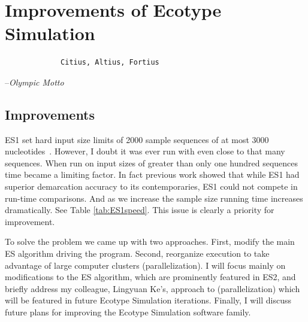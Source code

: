 \chapter{Improvements of Ecotype Simulation}


\begin{shadequote}
\begin{center}
    \Large\begin{verbatim} 
             Citius, Altius, Fortius
 \end{verbatim}  
\end{center}
\par--\emph{Olympic Motto}
\end{shadequote}


\section{Improvements}
ES1 set hard input size limits of 2000 sample sequences of at most 3000 nucleotides~\cite{koeppel2008identifying}.
However, I doubt it was ever run with even close to that many sequences.
When run on input sizes of greater than only one hundred sequences time became a limiting factor.
In fact previous work showed that while ES1 had superior demarcation accuracy to its contemporaries, ES1 could not compete in run-time comparisons.
And as we increase the sample size running time increases dramatically.
See Table \ref{tab:ES1speed}.
This issue is clearly a priority for improvement.

To solve the problem we came up with two approaches.
First, modify the main ES algorithm driving the program.
Second, reorganize execution to take advantage of large computer clusters (parallelization).
I will focus mainly on modifications to the ES algorithm, which are prominently featured in ES2, and briefly address my colleague, Lingyuan Ke's, approach to (parallelization) which will be featured in future Ecotype Simulation iterations.
Finally, I will discuss future plans for improving the Ecotype Simulation software family.


